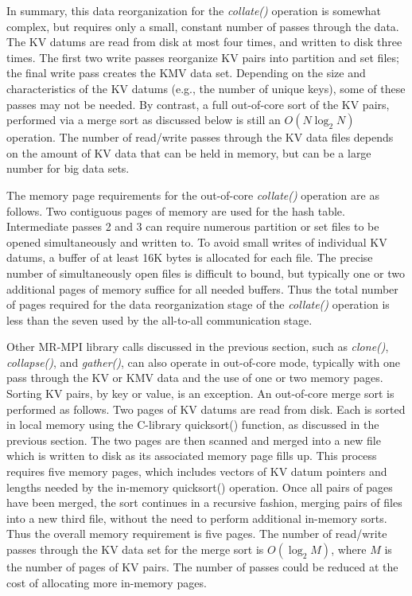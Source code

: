 In summary, this data reorganization for the {\it collate()} operation
is somewhat complex, but requires only a small, constant number of
passes through the data.  The KV datums are read from disk at most
four times, and written to disk three times.  The first two write
passes reorganize KV pairs into partition and set files; the final
write pass creates the KMV data set.  Depending on the size and
characteristics of the KV datums (e.g., the number of unique keys),
some of these passes may not be needed.  By contrast, a full
out-of-core sort of the KV pairs, performed via a merge sort as
discussed below is still an $O(N\log_2{N})$ operation.  The number of
read/write passes through the KV data files depends on the amount of
KV data that can be held in memory, but can be a large number for big
data sets.

The memory page requirements for the out-of-core {\it collate()}
operation are as follows.  Two contiguous pages of memory are used for
the hash table.  Intermediate passes 2 and 3 can require numerous
partition or set files to be opened simultaneously and written to.  To
avoid small writes of individual KV datums, a buffer of at least 16K
bytes is allocated for each file.  The precise number of
simultaneously open files is difficult to bound, but typically one or
two additional pages of memory suffice for all needed buffers.  Thus
the total number of pages required for the data reorganization stage
of the {\it collate()} operation is less than the seven used by the
all-to-all communication stage.

Other MR-MPI library calls discussed in the previous section, such as
{\it clone()}, {\it collapse()}, and {\it gather()}, can also operate
in out-of-core mode, typically with one pass through the KV or KMV
data and the use of one or two memory pages.  Sorting KV pairs, by key
or value, is an exception.  An out-of-core merge sort is performed as
follows.  Two pages of KV datums are read from disk.  Each is sorted
in local memory using the C-library quicksort() function, as discussed
in the previous section.  The two pages are then scanned and merged
into a new file which is written to disk as its associated memory page
fills up.  This process requires five memory pages, which includes
vectors of KV datum pointers and lengths needed by the in-memory
quicksort() operation.  Once all pairs of pages have been merged, the
sort continues in a recursive fashion, merging pairs of files into a
new third file, without the need to perform additional in-memory
sorts.  Thus the overall memory requirement is five pages.  The number
of read/write passes through the KV data set for the merge sort is
$O(\log_2{M})$, where $M$ is the number of pages of KV pairs.  The
number of passes could be reduced at the cost of allocating more
in-memory pages.
